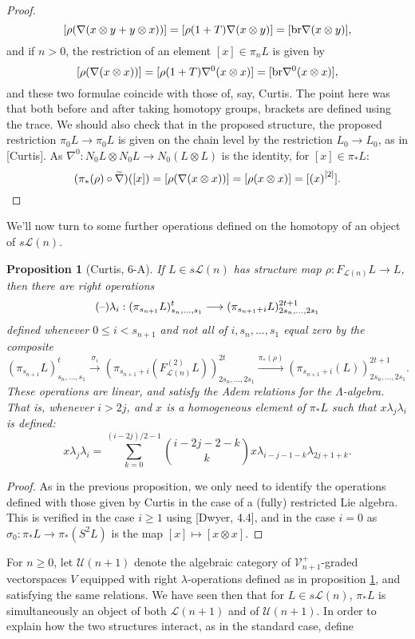 \documentclass[11pt]{amsart}
\theoremstyle{plain}
\newtheorem{prop}[thm]{Proposition}
\theoremstyle{definition}
\newcommand{\DASH}{\textup{--}}
\renewcommand{\to}{\longrightarrow}
\newcommand{\calU}{\mathcal{U}}
\newcommand{\calL}{\mathcal{L}}
\newcommand{\calV}{\mathcal{V}}
\theoremstyle{plain}
\newcommand{\restn}[1]{{#1}^{[2]}}
\newcommand{\vect}[2]{\calV^{#1}_{#2}}
\begin{document}
\begin{Lie algebras in characteristic 2 and their homotopy operations}
\begin{proof}
\[[\rho(\nabla(x\otimes y+y\otimes x))]=[\rho(1+T)\nabla(x\otimes y)]=[\textup{br}\nabla(x\otimes y)],\]
and if $n>0$, the restriction of an element $[x]\in\pi_nL$ is given by
\[[\rho(\nabla(x\otimes x))]=[\rho(1+T)\nabla^0(x\otimes x)]=[\textup{br}\nabla^0(x\otimes x)],\]
and these two formulae coincide with those of, say, Curtis. The point here was that both before and after taking homotopy groups, brackets are defined using the trace. We should also check that in the proposed structure, the proposed restriction $\pi_0L\to \pi_0L$ is given on the chain level by the restriction $L_0\to L_0$, as in [Curtis]. As $\nabla^0:N_0L\otimes N_0L\to N_0(L\otimes L)$ is the identity, for $[x]\in\pi_*L$:
\[(\pi_*(\rho)\circ\widetilde{\nabla})([x])=[\rho(\nabla(x\otimes x))]=[\rho(x\otimes x)]=[\restn{(x)}].\qedhere\]
\end{proof}
We'll now turn to some further operations defined on the homotopy of an object of $s\calL(n)$.
\begin{prop}[Curtis, 6-A]\label{linear operations on homotopy of lie alg}
If $L\in s\calL(n)$ has structure map $\rho:F_{\calL(n)}L\to L$, then there are right operations
\[(\DASH)\lambda_i:(\pi_{s_{n+1}}L)_{s_n,\ldots,s_1}^t\to (\pi_{s_{n+1}+i}L)_{2s_n,\ldots,2s_1}^{2t+1}\]
defined whenever $0\leq i<s_{n+1}$ and not all of $i,s_n,\ldots,s_1$ equal zero by the composite
\[(\pi_{s_{n+1}}L)_{s_n,\ldots,s_1}^t\overset{\sigma_i}{\to}(\pi_{s_{n+1}+i}(F^{(2)}_{\calL(n)}L))_{2s_n,\ldots,2s_1}^{2t}\overset{\pi_*(\rho)}{\to}(\pi_{s_{n+1}+i}(L))_{2s_n,\ldots,2s_1}^{2t+1}.\]
These operations are linear, and satisfy the Adem relations for the $\Lambda$-algebra. That is, whenever $i>2j$, and $x$ is a homogeneous element of $\pi_*L$ such that $x\lambda_j\lambda_i$ is defined:
\[x\lambda_j\lambda_i=\sum_{k=0}^{(i-2j)/2-1}{i-2j-2-k\choose k}x\lambda_{i-j-1-k}\lambda_{2j+1+k}.\]
\end{prop}
\begin{proof}
As in the previous proposition, we only need to identify the operations defined with those given by Curtis in the case of a (fully) restricted Lie algebra. This is verified in the case $i\geq1$ using [Dwyer, 4.4], and in the case $i=0$ as $\sigma_0:\pi_*L\to \pi_*(S^2L)$ is the map $[x]\mapsto[x\otimes x]$.
\end{proof}
For $n\geq0$, let $\calU(n+1)$ denote the algebraic category of $\vect{+}{n+1}$-graded vectorspaces $V$ equipped with right $\lambda$-operations defined as in proposition \ref{linear operations on homotopy of lie alg}, and satisfying the same relations. We have seen then that for $L\in s\calL(n)$, $\pi_*L$ is simultaneously an object of both $\calL(n+1)$ and of $\calU(n+1)$. In order to explain how the two structures interact, as in the standard case, define

\end{Lie algebras in characteristic 2 and their homotopy operations}
\end{document}

